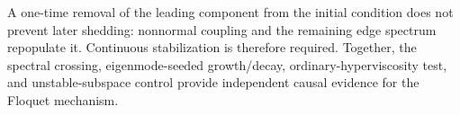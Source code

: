 A one-time removal of the leading component from the initial condition does not
prevent later shedding: nonnormal coupling and the remaining edge spectrum
repopulate it. Continuous stabilization is therefore required. Together, the
spectral crossing, eigenmode-seeded growth/decay, ordinary-hyperviscosity test,
and unstable-subspace control provide independent causal evidence for the
Floquet mechanism.
